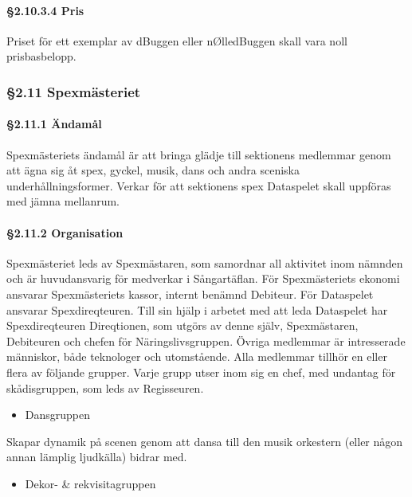 \paragraph{§2.10.3.4 Pris}

Priset för ett exemplar av dBuggen eller nØlledBuggen skall vara noll prisbasbelopp.

\subsubsection{§2.11 Spexmästeriet}

\paragraph{§2.11.1 Ändamål}

Spexmästeriets ändamål är att bringa glädje till sektionens medlemmar genom att ägna sig åt spex, gyckel, musik, dans och andra sceniska underhållningsformer. Verkar för att sektionens spex Dataspelet skall uppföras med jämna mellanrum.

\paragraph{§2.11.2 Organisation}

Spexmästeriet leds av Spexmästaren, som samordnar all aktivitet inom nämnden och är huvudansvarig för medverkar i Sångartäflan. För Spexmästeriets ekonomi ansvarar Spexmästeriets kassor, internt benämnd Debiteur. För Dataspelet ansvarar Spexdireqteuren. Till sin hjälp i arbetet med att leda Dataspelet har Spexdireqteuren Direqtionen, som utgörs av denne själv, Spexmästaren, Debiteuren och chefen för Näringslivsgruppen. Övriga medlemmar är intresserade människor, både teknologer och utomstående. Alla medlemmar tillhör en eller flera av följande grupper. Varje grupp utser inom sig en chef, med undantag för skådisgruppen, som leds av Regisseuren.

\begin{itemize}
  \item Dansgruppen
\end{itemize}

Skapar dynamik på scenen genom att dansa till den musik orkestern (eller någon annan lämplig ljudkälla) bidrar med.

\begin{itemize}
  \item Dekor- \& rekvisitagruppen
\end{itemize}

